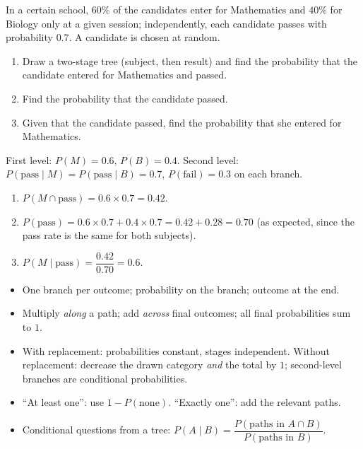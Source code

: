 \documentclass[11pt]{article}
\begin{document}
\begin{exercice}
In a certain school, $60\%$ of the candidates enter for Mathematics and $40\%$ for Biology only at a given session; independently, each candidate passes with probability $0.7$. A candidate is chosen at random.
\begin{enumerate}
\item Draw a two-stage tree (subject, then result) and find the probability that the candidate entered for Mathematics and passed.
\item Find the probability that the candidate passed.
\item Given that the candidate passed, find the probability that she entered for Mathematics.
\end{enumerate}
\end{exercice}

\begin{corrige}[Exercise 2]
First level: $P(M)=0.6$, $P(B)=0.4$. Second level: $P(\text{pass}\mid M)=P(\text{pass}\mid B)=0.7$, $P(\text{fail})=0.3$ on each branch.
\begin{enumerate}
\item $P(M\cap\text{pass})=0.6\times0.7=0.42$.
\item $P(\text{pass})=0.6\times0.7+0.4\times0.7=0.42+0.28=0.70$ (as expected, since the pass rate is the same for both subjects).
\item $P(M\mid\text{pass})=\dfrac{0.42}{0.70}=0.6$.
\end{enumerate}
\end{corrige}

\begin{aretenir}
\begin{itemize}
\item One branch per outcome; probability on the branch; outcome at the end.
\item Multiply \emph{along} a path; add \emph{across} final outcomes; all final probabilities sum to $1$.
\item With replacement: probabilities constant, stages independent. Without replacement: decrease the drawn category \emph{and} the total by $1$; second-level branches are conditional probabilities.
\item ``At least one'': use $1-P(\text{none})$. ``Exactly one'': add the relevant paths.
\item Conditional questions from a tree: $P(A\mid B)=\dfrac{P(\text{paths in }A\cap B)}{P(\text{paths in }B)}$.
\end{itemize}
\end{aretenir}
\end{document}
